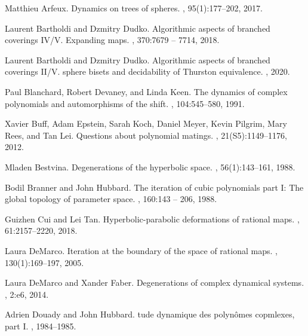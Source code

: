 \documentclass[11pt, reqno]{amsart}
\numberwithin{equation}{section}
\theoremstyle{plain}
\theoremstyle{theorem}
\theoremstyle{definition}
\numberwithin{figure}{section}
\begin{document}

\newcommand{\etalchar}[1]{$^{#1}$}
\begin{thebibliography}{DPWY20}

Matthieu Arfeux.
\newblock Dynamics on trees of spheres.
, 95(1):177--202,
  2017.

Laurent Bartholdi and Dzmitry Dudko.
\newblock Algorithmic aspects of branched coverings {IV/V}. {Expanding maps}.
, 370:7679 -- 7714, 2018.

Laurent Bartholdi and Dzmitry Dudko.
\newblock Algorithmic aspects of branched coverings {II/V}. {sphere bisets and
  decidability of Thurston equivalence}.
, 2020.

Paul Blanchard, Robert Devaney, and Linda Keen.
\newblock The dynamics of complex polynomials and automorphisms of the shift.
, 104:545--580, 1991.

\bibitem[BEK{\etalchar{+}}12]{BEKMPRL12}
Xavier Buff, Adam Epstein, Sarah Koch, Daniel Meyer, Kevin Pilgrim, Mary
  Rees, and Tan Lei.
\newblock Questions about polynomial matings.
, 21(S5):1149--1176, 2012.

Mladen Bestvina.
\newblock Degenerations of the hyperbolic space.
, 56(1):143--161, 1988.

Bodil Branner and John Hubbard.
\newblock The iteration of cubic polynomials part {I}: The global topology of
  parameter space.
, 160:143 -- 206, 1988.

Guizhen Cui and Lei Tan.
\newblock Hyperbolic-parabolic deformations of rational maps.
, 61:2157--2220, 2018.

Laura DeMarco.
\newblock Iteration at the boundary of the space of rational maps.
, 130(1):169--197, 2005.

Laura {DeMarco} and Xander Faber.
\newblock Degenerations of complex dynamical systems.
, 2:e6, 2014.

Adrien Douady and John Hubbard.
tude dynamique des polyn\^omes copmlexes, part {I}.
, 1984--1985.


\end{thebibliography}
\end{document}
